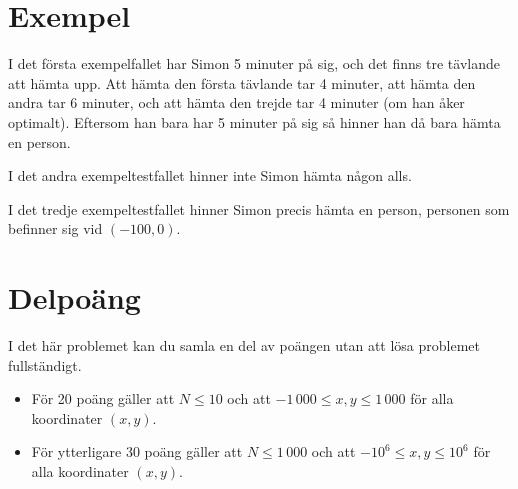 \section*{Exempel}
I det första exempelfallet har Simon 5 minuter på sig, och det finns tre
tävlande att hämta upp. Att hämta den första tävlande tar 4 minuter, att hämta
den andra tar 6 minuter, och att hämta den trejde tar 4 minuter (om han åker
optimalt). Eftersom han bara har 5 minuter på sig så hinner han då bara hämta
en person.

I det andra exempeltestfallet hinner inte Simon hämta någon alls.

I det tredje exempeltestfallet hinner Simon precis hämta en person, personen
som befinner sig vid $(-100, 0)$.

\section*{Delpoäng}
I det här problemet kan du samla en del av poängen utan att lösa problemet
fullständigt.

\begin{itemize}
    \item För 20 poäng gäller att $N \leq 10$ och att $-1\,000 \leq x,y \leq 1\,000$
          för alla koordinater $(x,y)$.
    \item För ytterligare 30 poäng gäller att $N \leq 1\,000$ och att
          $-10^6 \leq x,y \leq 10^6$ för alla koordinater $(x,y)$.
\end{itemize}
